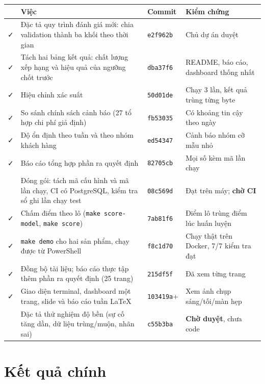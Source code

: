 \documentclass[11pt,a4paper]{article}
\newcommand{\run}[1]{\texttt{\small #1}}
\newcommand{\ok}{\textcolor{okC}{\faCheck}}
\newcommand{\wait}{\textcolor{warnC}{\faHourglassHalf}}
\begin{document}
\begin{small}
\renewcommand{\arraystretch}{1.25}
\begin{longtable}{@{}p{0.5cm}p{6.6cm}p{1.6cm}p{6.6cm}@{}}
\toprule
 & \textbf{Việc} & \textbf{Commit} & \textbf{Kiểm chứng} \\
\midrule
\endhead
\ok & Đặc tả quy trình đánh giá mới: chia validation thành ba khối theo thời gian & \run{e2f962b} & Chủ dự án duyệt \\
\ok & Tách hai bảng kết quả: chất lượng xếp hạng và hiệu quả của ngưỡng chốt trước & \run{dba37f6} & README, báo cáo, dashboard thống nhất \\
\ok & Hiệu chỉnh xác suất & \run{50d01de} & Chạy 3 lần, kết quả trùng từng byte \\
\ok & So sánh chính sách cảnh báo (27 tổ hợp chi phí giả định) & \run{fb53035} & Có khoảng tin cậy theo ngày \\
\ok & Độ ổn định theo tuần và theo nhóm khách hàng & \run{ed54347} & Cảnh báo nhóm cỡ mẫu nhỏ \\
\ok & Báo cáo tổng hợp phần ra quyết định & \run{82705cb} & Mọi số kèm mã lần chạy \\
\wait & Đóng gói: tách mã cấu hình và mã lần chạy, CI có PostgreSQL, kiểm tra sổ ghi lần chạy test & \run{08c569d} & Đạt trên máy; \textbf{chờ CI} \\
\ok & Chấm điểm theo lô (\texttt{make score-model}, \texttt{make score}) & \run{7ab81f6} & Điểm lô trùng điểm lúc huấn luyện \\
\ok & \texttt{make demo} cho hai sản phẩm, chạy được từ PowerShell & \run{f8c1d70} & Chạy thật trên Docker, 7/7 kiểm tra đạt \\
\ok & Đồng bộ tài liệu; báo cáo thực tập thêm phần ra quyết định (25 trang) & \run{215df5f} & Đã xem từng trang \\
\ok & Giao diện terminal, dashboard một trang, slide và báo cáo tuần LaTeX & \run{103419a}+ & Xem ảnh chụp sáng/tối/màn hẹp \\
\wait & Đặc tả thử nghiệm độ bền (sự cố tăng dần, dữ liệu trùng/muộn, nhãn sai) & \run{c55b3ba} & \textbf{Chờ duyệt}, chưa code \\
\bottomrule
\end{longtable}
\end{small}

\section{Kết quả chính}
\end{document}
